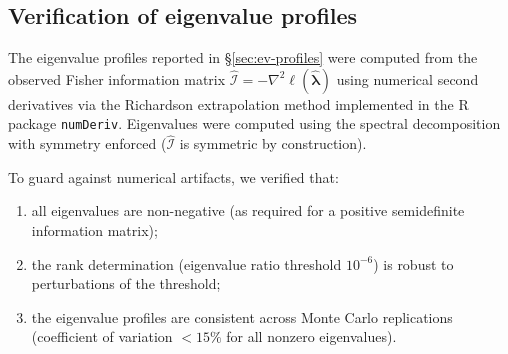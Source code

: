 \documentclass[12pt]{article}
\theoremstyle{definition}
\theoremstyle{remark}
\newcommand{\blam}{\boldsymbol{\lambda}}
\begin{document}
\subsection{Verification of eigenvalue profiles}
\label{sec:verify-ev}

The eigenvalue profiles reported in
\S\ref{sec:ev-profiles} were computed from the observed Fisher
information matrix $\hat{\mathcal{I}} = -\nabla^2 \ell(\hat{\blam})$
using numerical second derivatives via the Richardson extrapolation
method implemented in the R package \texttt{numDeriv}.  Eigenvalues
were computed using the spectral decomposition with symmetry enforced
($\hat{\mathcal{I}}$ is symmetric by construction).

To guard against numerical artifacts, we verified that:
\begin{enumerate}[label=(\roman*)]
  \item all eigenvalues are non-negative (as required for a positive
    semidefinite information matrix);
  \item the rank determination (eigenvalue ratio threshold $10^{-6}$)
    is robust to perturbations of the threshold;
  \item the eigenvalue profiles are consistent across Monte Carlo
    replications (coefficient of variation $< 15\%$ for all nonzero
    eigenvalues).
\end{enumerate}




\end{document}
